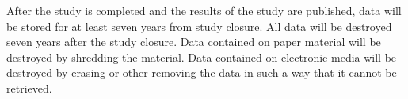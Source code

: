 After the study is completed and the results of the study are published, data will be stored for at least seven years from study closure. All data will be destroyed seven years after the study closure. Data contained on paper material will be destroyed by shredding the material. Data contained on electronic media will be destroyed by erasing or other removing the data in such a way that it cannot be retrieved. 

